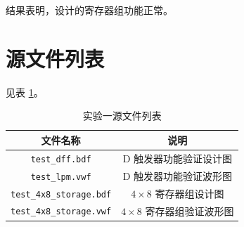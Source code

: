 结果表明，设计的寄存器组功能正常。

\section{源文件列表}

见表 \ref{table:1-files}。

\begin{table}[h]
    \centering
    \caption{实验一源文件列表}
    \label{table:1-files}
    \begin{tabular}{|c|c|}
        \hline
        文件名称 & 说明 \\ \hline
        \verb|test_dff.bdf| & D 触发器功能验证设计图 \\ \hline
        \verb|test_lpm.vwf| & D 触发器功能验证波形图 \\ \hline
        \verb|test_4x8_storage.bdf| & $4 \times 8$ 寄存器组设计图 \\ \hline
        \verb|test_4x8_storage.vwf| & $4 \times 8$ 寄存器组验证波形图 \\ \hline
    \end{tabular}
\end{table}